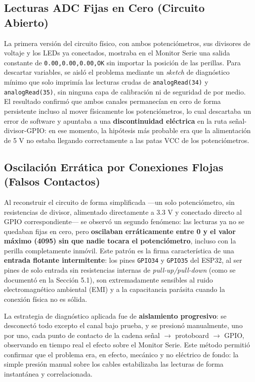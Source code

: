 \documentclass[12pt, letterpaper]{article}
\begin{document}
	\subsection{Lecturas ADC Fijas en Cero (Circuito Abierto)}
	La primera versión del circuito físico, con ambos potenciómetros, sus divisores de voltaje y los LEDs ya conectados, mostraba en el Monitor Serie una salida constante de \texttt{0.00,0.00,0.00,OK} sin importar la posición de las perillas. Para descartar variables, se aisló el problema mediante un \textit{sketch} de diagnóstico mínimo que solo imprimía las lecturas crudas de \texttt{analogRead(34)} y \texttt{analogRead(35)}, sin ninguna capa de calibración ni de seguridad de por medio. El resultado confirmó que ambos canales permanecían en cero de forma persistente incluso al mover físicamente los potenciómetros, lo cual descartaba un error de software y apuntaba a una \textbf{discontinuidad eléctrica} en la ruta señal-divisor-GPIO: en ese momento, la hipótesis más probable era que la alimentación de 5 V no estaba llegando correctamente a las patas VCC de los potenciómetros.
	
	\subsection{Oscilación Errática por Conexiones Flojas (Falsos Contactos)}
	Al reconstruir el circuito de forma simplificada —un solo potenciómetro, sin resistencias de divisor, alimentado directamente a 3.3 V y conectado directo al GPIO correspondiente— se observó un segundo fenómeno: las lecturas ya no se quedaban fijas en cero, pero \textbf{oscilaban erráticamente entre 0 y el valor máximo (4095) sin que nadie tocara el potenciómetro}, incluso con la perilla completamente inmóvil. Este patrón es la firma característica de una \textbf{entrada flotante intermitente}: los pines \texttt{GPIO34} y \texttt{GPIO35} del ESP32, al ser pines de solo entrada sin resistencias internas de \textit{pull-up/pull-down} (como se documentó en la Sección 5.1), son extremadamente sensibles al ruido electromagnético ambiental (EMI) y a la capacitancia parásita cuando la conexión física no es sólida.
	
	La estrategia de diagnóstico aplicada fue de \textbf{aislamiento progresivo}: se desconectó todo excepto el canal bajo prueba, y se presionó manualmente, uno por uno, cada punto de contacto de la cadena señal $\rightarrow$ protoboard $\rightarrow$ GPIO, observando en tiempo real el efecto sobre el Monitor Serie. Este método permitió confirmar que el problema era, en efecto, mecánico y no eléctrico de fondo: la simple presión manual sobre los cables estabilizaba las lecturas de forma instantánea y correlacionada.
	
\end{document}
